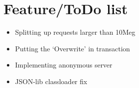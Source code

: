 \section{Feature/ToDo list}
\begin{itemize}
  \item Splitting up requests larger than 10Meg
  \item Putting the `Overwrite' in transaction
  \item Implementing anonymous server
  \item JSON-lib classloader fix
\end{itemize}